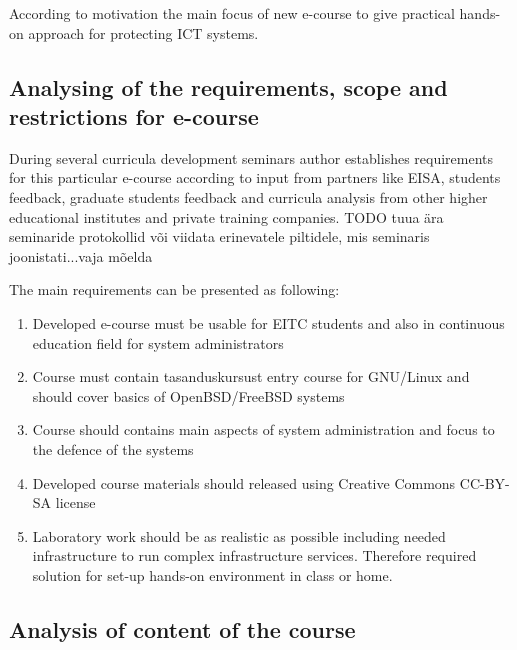 According to motivation the main focus of new e-course to give practical hands-on approach for protecting \gls{ICT} systems.

\subsection{Analysing of the requirements, scope and restrictions for e-course}
During several curricula development seminars author establishes requirements for this particular e-course according to input from partners like \gls{EISA}, students feedback, graduate students feedback and curricula analysis from other higher educational institutes and private training companies. {\color{red} TODO tuua ära seminaride protokollid või viidata erinevatele piltidele, mis seminaris joonistati...vaja mõelda}


The main requirements can be presented as following:

\begin{enumerate}[label=Requirement \arabic*.,leftmargin=*]
  \item Developed e-course must be usable for \gls{EITC} students and also in continuous education field for system administrators
  \item Course must contain {\color{red} tasanduskursust} entry course for GNU/Linux and should cover basics  of OpenBSD/FreeBSD systems
  \item Course should contains main aspects of system administration and focus to the defence of the systems
  \item Developed course materials should released using Creative Commons \gls{CC-BY-SA} license
  \item Laboratory work should be as realistic as possible including needed infrastructure to run complex infrastructure services. Therefore required solution for set-up hands-on environment in class or home.
\end{enumerate}



\subsection{Analysis of content of the course}

